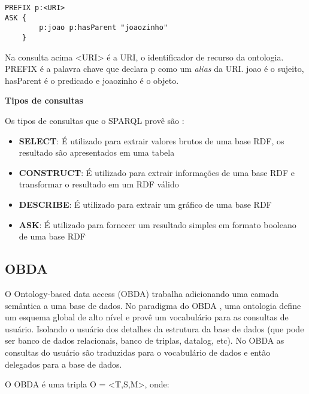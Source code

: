 \lstset{language=SQL,basicstyle=\ttfamily,breaklines=true}
\begin{lstlisting}
PREFIX p:<URI>
ASK {
        p:joao p:hasParent "joaozinho" 
    }
\end{lstlisting} 

\vskip 0.6cm

Na consulta acima <URI> é a URI, o identificador de recurso da ontologia. 
PREFIX é a palavra chave  que declara p como um \textit{alias} da URI. joao é o
sujeito, hasParent é o predicado e joaozinho é o objeto.

\textbf{Tipos de consultas}

Os tipos de consultas que o SPARQL provê são \cite{beckett2006sparql}:

\begin{itemize}

    \item \textbf{SELECT}: É utilizado para extrair valores brutos de uma base
    RDF, os resultado são apresentados em uma tabela
    
    \item \textbf{CONSTRUCT}: É utilizado para extrair informações de uma base 
    RDF e transformar o resultado em um RDF válido
    
    \item \textbf{DESCRIBE}: É utilizado para extrair um gráfico de uma base 
    RDF
    
    \item \textbf{ASK}: É utilizado para fornecer um resultado simples em formato
    booleano de uma base RDF

\end{itemize}

\subsection{OBDA}
\label{sec:obda}

O Ontology-based data access (OBDA) trabalha adicionando uma camada semântica
a uma base de dados. No paradigma do OBDA \cite{rodriguez2013ontology}, uma 
ontologia define um esquema global de alto nível e provê um vocabulário para 
as consultas de usuário. Isolando o usuário dos detalhes da estrutura da base 
de dados (que pode ser banco de dados relacionais, banco de triplas, datalog, 
etc). No OBDA as consultas do usuário são traduzidas para o vocabulário de dados 
e então delegados para a base de dados.

O OBDA é uma tripla O = <T,S,M>, onde:

